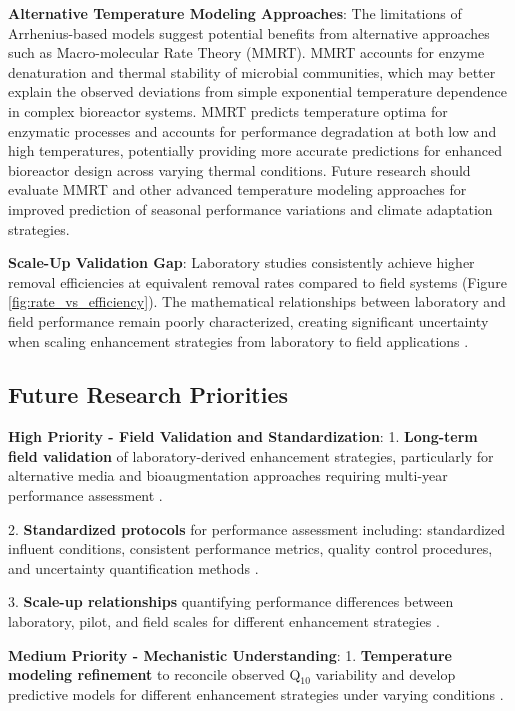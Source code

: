 \documentclass[12pt,a4paper]{article}
\begin{document}
\textbf{Alternative Temperature Modeling Approaches}: The limitations of Arrhenius-based models suggest potential benefits from alternative approaches such as Macro-molecular Rate Theory (MMRT). MMRT accounts for enzyme denaturation and thermal stability of microbial communities, which may better explain the observed deviations from simple exponential temperature dependence in complex bioreactor systems. MMRT predicts temperature optima for enzymatic processes and accounts for performance degradation at both low and high temperatures, potentially providing more accurate predictions for enhanced bioreactor design across varying thermal conditions. Future research should evaluate MMRT and other advanced temperature modeling approaches for improved prediction of seasonal performance variations and climate adaptation strategies.

\textbf{Scale-Up Validation Gap}: Laboratory studies consistently achieve higher removal efficiencies at equivalent removal rates compared to field systems (Figure \ref{fig:rate_vs_efficiency}). The mathematical relationships between laboratory and field performance remain poorly characterized, creating significant uncertainty when scaling enhancement strategies from laboratory to field applications \citep{RN312}.

\subsection{Future Research Priorities}

\textbf{High Priority - Field Validation and Standardization}:
1. \textbf{Long-term field validation} of laboratory-derived enhancement strategies, particularly for alternative media and bioaugmentation approaches requiring multi-year performance assessment \citep{RN629}.

2. \textbf{Standardized protocols} for performance assessment including: standardized influent conditions, consistent performance metrics, quality control procedures, and uncertainty quantification methods \citep{RN310}.

3. \textbf{Scale-up relationships} quantifying performance differences between laboratory, pilot, and field scales for different enhancement strategies \citep{RN312}.

\textbf{Medium Priority - Mechanistic Understanding}:
1. \textbf{Temperature modeling refinement} to reconcile observed Q$_{10}$ variability and develop predictive models for different enhancement strategies under varying conditions \citep{RN242, RN258}.
\end{document}
